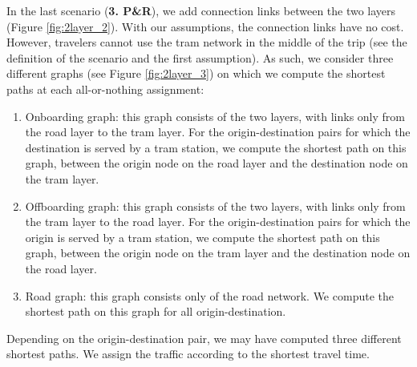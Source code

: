 In the last scenario (\textbf{3. P\&R}), we add connection links between the two layers (Figure \ref{fig:2layer_2}). With our assumptions, the connection links have no cost. However, travelers cannot use the tram network in the middle of the trip (see the definition of the scenario and the first assumption). As such, we consider three different graphs (see Figure \ref{fig:2layer_3}) on which we compute the shortest paths at each all-or-nothing assignment:
\begin{enumerate}
    \item Onboarding graph: this graph consists of the two layers, with links only from the road layer to the tram layer. For the origin-destination pairs for which the destination is served by a tram station, we compute the shortest path on this graph, between the origin node on the road layer and the destination node on the tram layer.
    \item Offboarding graph: this graph consists of the two layers, with links only from the tram layer to the road layer. For the origin-destination pairs for which the origin is served by a tram station, we compute the shortest path on this graph, between the origin node on the tram layer and the destination node on the road layer.
    \item Road graph: this graph consists only of the road network. We compute the shortest path on this graph for all origin-destination.
\end{enumerate}

Depending on the origin-destination pair, we may have computed three different shortest paths. We assign the traffic according to the shortest travel time.



